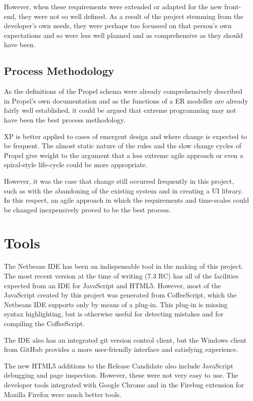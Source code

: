 However, when these requirements were extended or adapted for the new front-end, they were not so well defined. As a result of the project stemming from the developer's own needs, they were perhaps too focussed on that person's own expectations and so were less well planned and as comprehensive as they should have been.

\subsection{Process Methodology}
As the definitions of the Propel schema were already comprehensively described in Propel's own documentation and as the functions of a ER modeller are already fairly well established, it could be argued that extreme programming may not have been the best process methodology.

XP is better applied to cases of emergent design and where change is expected to be frequent. The almost static nature of the rules and the slow change cycles of Propel give weight to the argument that a less extreme agile approach or even a spiral-style life-cycle could be more appropriate.

However, it was the case that change still occurred frequently in this project, such as with the abandoning of the existing system and in creating a UI library. In this respect, an agile approach in which the requirements and time-scales could be changed inexpensively proved to be the best process.

\section{Tools}
The Netbeans IDE has been an indispensable tool in the making of this project. The most recent version at the time of writing (7.3 RC) has all of the facilities expected from an IDE for Java\-Script and HTML5. However, most of the Java\-Script created by this project was generated from Coffee\-Script, which the Netbeans IDE supports only by means of a plug-in. This plug-in is missing syntax highlighting, but is otherwise useful for detecting mistakes and for compiling the Coffee\-Script.

The IDE also has an integrated git version control client, but the Windows client from GitHub provides a more user-friendly interface and satisfying experience.

The new HTML5 additions to the Release Candidate also include Java\-Script debugging and page inspection. However, these were not very easy to use. The developer tools integrated with Google Chrome and in the Firebug extension for Mozilla Firefox were much better tools.

